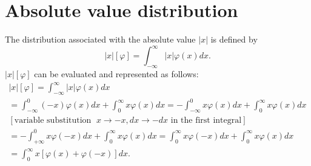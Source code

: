 %


\section{Absolute value distribution}


The distribution associated with the absolute value $\left|x\right|$ is defined by
 \begin{equation}
\left|x\right| \left[ \varphi \right] =
\int_{-\infty}^\infty  \left|x\right|  \varphi(x) dx.
 \end{equation}
$\left|x\right| \left[ \varphi \right]$
can be evaluated and represented as follows:
\begin{equation}
\begin{split}
\left|x\right| \left[ \varphi \right]
=
\int_{-\infty}^\infty  \left|x\right|  \varphi(x) dx
\\
=
\int_{-\infty}^0 (-x)  \varphi(x) dx
+
\int_{0}^\infty   x   \varphi(x) dx
=
-\int_{-\infty}^0  x   \varphi(x) dx
+
\int_{0}^\infty   x   \varphi(x) dx
\\
[\textrm{variable substitution }\; x\rightarrow -x, dx \rightarrow -dx \textrm{ in the first integral}]
\\
=
-\int_{+\infty}^0  x   \varphi(-x) dx
+
\int_{0}^\infty   x   \varphi(x) dx
=
\int_0^{\infty}  x   \varphi(-x) dx
+
\int_{0}^\infty   x   \varphi(x) dx
\\
=
\int_0^{\infty}  x   \left[ \varphi(x) + \varphi(-x) \right] dx .
\end{split}
\end{equation}

